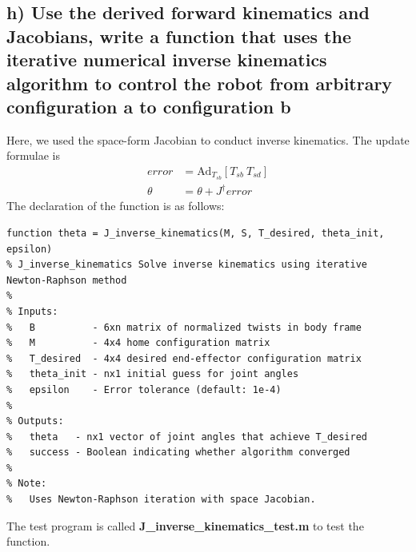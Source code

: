 \documentclass[english,10pt,a4paper]{article}
\begin{document}
    \subsection*{h) Use the derived forward kinematics and Jacobians, write a function that uses the iterative numerical inverse kinematics algorithm to control the robot from arbitrary configuration a to configuration b}
    Here, we used the space-form Jacobian to conduct inverse kinematics. The update formulae is
    \begin{align}
        error &= \text{Ad}_{T_{sb}} [T_{sb} \ T_{sd}]\\ \nonumber
        \theta &= \theta + J^\dagger error
    \end{align}
    The declaration of the function is as follows:
    \begin{lstlisting}[style=matlab]
function theta = J_inverse_kinematics(M, S, T_desired, theta_init, epsilon)
% J_inverse_kinematics Solve inverse kinematics using iterative Newton-Raphson method
%
% Inputs:
%   B          - 6xn matrix of normalized twists in body frame
%   M          - 4x4 home configuration matrix
%   T_desired  - 4x4 desired end-effector configuration matrix
%   theta_init - nx1 initial guess for joint angles
%   epsilon    - Error tolerance (default: 1e-4)
%
% Outputs:
%   theta   - nx1 vector of joint angles that achieve T_desired
%   success - Boolean indicating whether algorithm converged
%
% Note:
%   Uses Newton-Raphson iteration with space Jacobian.
    \end{lstlisting}
    The test program is called \textbf{J\_inverse\_kinematics\_test.m} to test the function.
\end{document}

